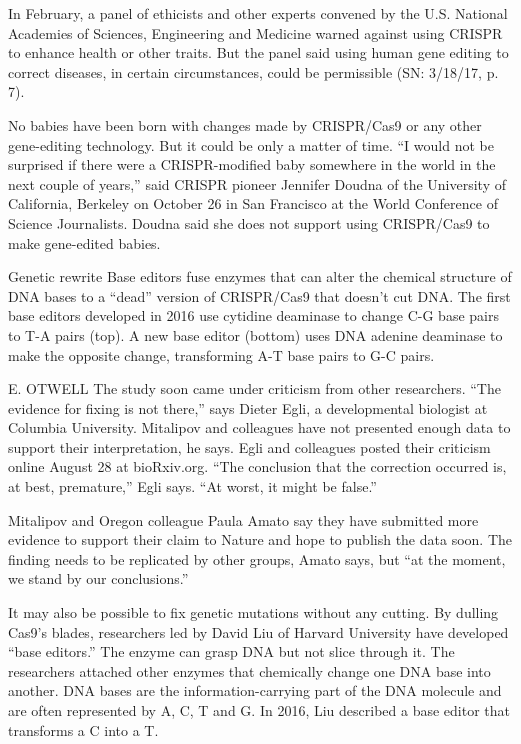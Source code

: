 \documentclass[12pt]{article}
\begin{document}
In February, a panel of ethicists and other experts convened by the U.S. National Academies of Sciences, Engineering and Medicine warned against using CRISPR to enhance health or other traits. But the panel said using human gene editing to correct diseases, in certain circumstances, could be permissible (SN: 3/18/17, p. 7).

No babies have been born with changes made by CRISPR/Cas9 or any other gene-editing technology. But it could be only a matter of time. “I would not be surprised if there were a CRISPR-modified baby somewhere in the world in the next couple of years,” said CRISPR pioneer Jennifer Doudna of the University of California, Berkeley on October 26 in San Francisco at the World Conference of Science Journalists. Doudna said she does not support using CRISPR/Cas9 to make gene-edited babies.

Genetic rewrite
Base editors fuse enzymes that can alter the chemical structure of DNA bases to a “dead” version of CRISPR/Cas9 that doesn’t cut DNA. The first base editors developed in 2016 use cytidine deaminase to change C-G base pairs to T-A pairs (top). A new base editor (bottom) uses DNA adenine deaminase to make the opposite change, transforming A-T base pairs to G-C pairs.


E. OTWELL
The study soon came under criticism from other researchers. “The evidence for fixing is not there,” says Dieter Egli, a developmental biologist at Columbia University. Mitalipov and colleagues have not presented enough data to support their interpretation, he says. Egli and colleagues posted their criticism online August 28 at bioRxiv.org. “The conclusion that the correction occurred is, at best, premature,” Egli says. “At worst, it might be false.”

Mitalipov and Oregon colleague Paula Amato say they have submitted more evidence to support their claim to Nature and hope to publish the data soon. The finding needs to be replicated by other groups, Amato says, but “at the moment, we stand by our conclusions.”

It may also be possible to fix genetic mutations without any cutting. By dulling Cas9’s blades, researchers led by David Liu of Harvard University have developed “base editors.” The enzyme can grasp DNA but not slice through it. The researchers attached other enzymes that chemically change one DNA base into another. DNA bases are the information-carrying part of the DNA molecule and are often represented by A, C, T and G. In 2016, Liu described a base editor that transforms a C into a T.
\end{document}
